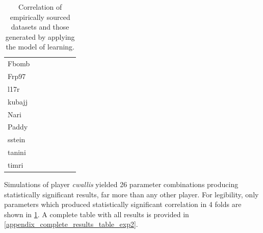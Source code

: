 \begin{table}
\begin{tabular}{@{}l r r r r r r@{}}
Fbomb & \noparams{} \\
Frp97 & \noparams{} \\
l17r & \noparams{} \\
kubajj & \noparams{} \\
Nari & \noparams{} \\
Paddy & \noparams{} \\
sstein & \noparams{} \\
tanini & \noparams{} \\
timri & \noparams{} \\
\bottomrule
    \end{tabular}
    \caption{Correlation of empirically sourced datasets and those generated by applying the \aspectoriented model of learning.}
    \label{learning_model_results_table_comparison_to_real_world_datasets_correlating_players}
\end{table}


Simulations of player \emph{cwallis} yielded 26 parameter combinations producing
statistically significant results, far more than any other player. For
legibility, only parameters which produced statistically significant correlation
in 4 folds are shown in
\cref{learning_model_results_table_comparison_to_real_world_datasets_correlating_players}.
A complete table with all results is provided in
\cref{appendix_complete_results_table_exp2}.



